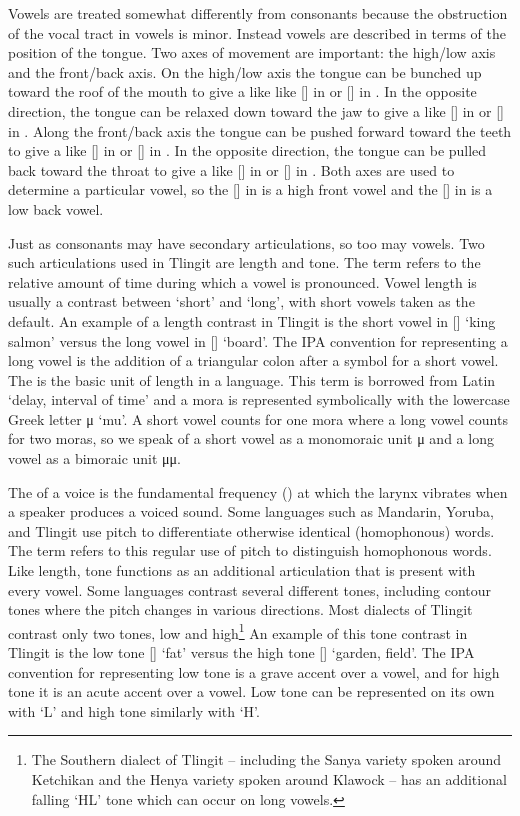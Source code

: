Vowels are treated somewhat differently from consonants because the obstruction of the vocal tract in vowels is minor. Instead vowels are described in terms of the position of the tongue. Two axes of movement are important: the high/low axis and the front/back axis. On the high/low axis the tongue can be bunched up toward the roof of the mouth to give a  like like [] in  or [] in . In the opposite direction, the tongue can be relaxed down toward the jaw to give a  like [] in  or [] in . Along the front/back axis the tongue can be pushed forward toward the teeth to give a  like [] in  or [] in . In the opposite direction, the tongue can be pulled back toward the throat to give a  like [] in  or [] in . Both axes are used to determine a particular vowel, so the [] in  is a high front vowel and the [] in  is a low back vowel.

Just as consonants may have secondary articulations, so too may vowels. Two such articulations used in Tlingit are length and tone. The term  refers to the relative amount of time during which a vowel is pronounced. Vowel length is usually a contrast between ‘short’ and ‘long’, with short vowels taken as the default. An example of a length contrast in Tlingit is the short vowel in  [] ‘king salmon’ versus the long vowel in  [] ‘board’. The IPA convention for representing a long vowel is the addition of a triangular colon  after a symbol for a short vowel. The  is the basic unit of length in a language. This term is borrowed from Latin  ‘delay, interval of time’ and a mora is represented symbolically with the lowercase Greek letter μ ‘mu’. A short vowel counts for one mora where a long vowel counts for two moras, so we speak of a short vowel as a monomoraic unit μ and a long vowel as a bimoraic unit μμ.

The  of a voice is the fundamental frequency (\!\Fzero) at which the larynx vibrates when a speaker produces a voiced sound. Some languages such as Mandarin, Yoruba, and Tlingit use pitch to differentiate otherwise identical (homophonous) words. The term  refers to this regular use of pitch to distinguish  homophonous words. Like length, tone functions as an additional articulation that is present with every vowel. Some languages contrast several different tones, including contour tones where the pitch changes in various directions. Most dialects of Tlingit contrast only two tones, low and high\footnote{The Southern dialect of Tlingit – including the Sanya variety spoken around Ketchikan and the Henya variety spoken around Klawock – has an additional falling ‘HL’ tone which can occur on long vowels.}  An example of this tone contrast in Tlingit is the low tone  [] ‘fat’ versus the high tone  [] ‘garden, field’. The IPA convention for representing low tone is a grave accent  over a vowel, and for high tone it is an acute accent  over a vowel. Low tone can be represented on its own with ‘L’ and high tone similarly with ‘H’.


